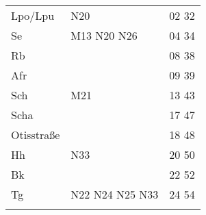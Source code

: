 \begin{tabular}{!{\color{schiefergrau}\vrule width 3pt}*{3}{l!{\color{schiefergrau}\vrule width 3pt}}}
\hline
Lpo/Lpu      & \nuneun{} \nbus{} N20               & 02 32 \\
Se           & \mtram{} M13 \nbus{} N20 N26        & 04 34 \\
Rb           &                                     & 08 38 \\
Afr          &                                     & 09 39 \\
Sch          & \mbus{} M21                         & 13 43 \\
Scha         &                                     & 17 47 \\
Otisstraße   &                                     & 18 48 \\
Hh           & \nbus{} N33                         & 20 50 \\
Bk           &                                     & 22 52 \\
Tg           & \nbus{} N22 N24 N25 N33             & 24 54 \\
\myhline
\end{tabular}
